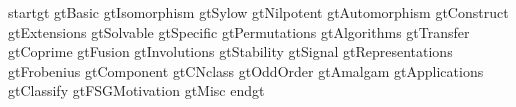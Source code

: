  {startgt}
 {gtBasic}
 {gtIsomorphism}
 {gtSylow}
 {gtNilpotent}
 {gtAutomorphism}
 {gtConstruct}
 {gtExtensions}
 {gtSolvable}
 {gtSpecific}
 {gtPermutations}
 {gtAlgorithms}
 {gtTransfer}
 {gtCoprime}
 {gtFusion}
 {gtInvolutions}
 {gtStability}
 {gtSignal}
 {gtRepresentations}
 {gtFrobenius}
 {gtComponent}
 {gtCNclass}
 {gtOddOrder}
 {gtAmalgam}
 {gtApplications}
 {gtClassify}
 {gtFSGMotivation}
 {gtMisc}
 {endgt}

